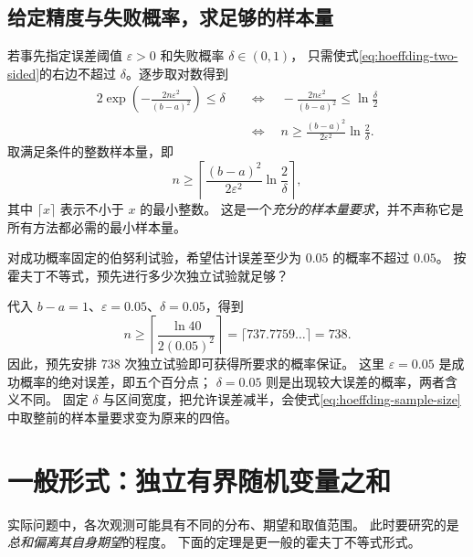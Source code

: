 \documentclass[UTF8,12pt,a4paper,fontset=fandol]{ctexart}
\begin{document}
\subsection{给定精度与失败概率，求足够的样本量}

若事先指定误差阈值 $\varepsilon>0$ 和失败概率 $\delta\in(0,1)$，
只需使式\eqref{eq:hoeffding-two-sided}的右边不超过 $\delta$。逐步取对数得到
\begin{align*}
  2\exp\!\left(-\frac{2n\varepsilon^2}{(b-a)^2}\right)\leq\delta
  &\quad\Longleftrightarrow\quad
  -\frac{2n\varepsilon^2}{(b-a)^2}\leq\ln\frac{\delta}{2}\\
  &\quad\Longleftrightarrow\quad
  n\geq\frac{(b-a)^2}{2\varepsilon^2}\ln\frac{2}{\delta}.
\end{align*}
取满足条件的整数样本量，即
\begin{equation}
  n\geq\left\lceil
    \frac{(b-a)^2}{2\varepsilon^2}\ln\frac{2}{\delta}
  \right\rceil,
  \label{eq:hoeffding-sample-size}
\end{equation}
其中 $\lceil x\rceil$ 表示不小于 $x$ 的最小整数。
这是一个\emph{充分的样本量要求}，并不声称它是所有方法都必需的最小样本量。

\begin{example}[允许误差为五个百分点]
对成功概率固定的伯努利试验，希望估计误差至少为 $0.05$ 的概率不超过 $0.05$。
按霍夫丁不等式，预先进行多少次独立试验就足够？
\end{example}
\begin{solve}
代入 $b-a=1$、$\varepsilon=0.05$、$\delta=0.05$，得到
\[
  n\geq\left\lceil\frac{\ln40}{2(0.05)^2}\right\rceil
   =\lceil737.7759\ldots\rceil=738.
\]
因此，预先安排 $738$ 次独立试验即可获得所要求的概率保证。
这里 $\varepsilon=0.05$ 是成功概率的绝对误差，即五个百分点；
$\delta=0.05$ 则是出现较大误差的概率，两者含义不同。
固定 $\delta$ 与区间宽度，把允许误差减半，会使式\eqref{eq:hoeffding-sample-size}中取整前的样本量要求变为原来的四倍。
\end{solve}

\section{一般形式：独立有界随机变量之和}
\label{sec:hoeffding-general}

实际问题中，各次观测可能具有不同的分布、期望和取值范围。
此时要研究的是\emph{总和偏离其自身期望}的程度。
下面的定理是更一般的霍夫丁不等式形式\cite{hoeffding1963}。
\end{document}
